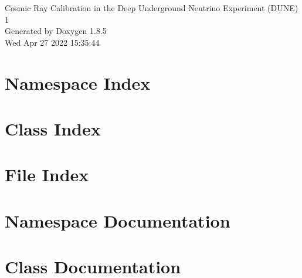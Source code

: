\documentclass[twoside]{book}
\newcommand{\clearemptydoublepage}{%
  \newpage{\pagestyle{empty}\cleardoublepage}%
}
\begin{document}
\hypersetup{pageanchor=false}
\begin{titlepage}
\vspace*{7cm}
\begin{center}%
{\Large Cosmic Ray Calibration in the Deep Underground Neutrino Experiment (D\-U\-N\-E) \\[1ex]\large 1 }\\
\vspace*{1cm}
{\large Generated by Doxygen 1.8.5}\\
\vspace*{0.5cm}
{\small Wed Apr 27 2022 15:35:44}\\
\end{center}
\end{titlepage}
\clearemptydoublepage
\tableofcontents
\clearemptydoublepage
{}
\hypersetup{pageanchor=true}

\chapter{Namespace Index}

\chapter{Class Index}

\chapter{File Index}

\chapter{Namespace Documentation}



\chapter{Class Documentation}





\end{document}
